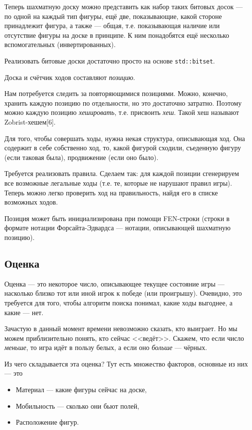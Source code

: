 {	Теперь шахматную доску можно представить как набор таких битовых досок --- по одной на каждый тип фигуры, ещё две, показывающие, какой стороне принадлежит фигура, а также --- общая, т.е. показывающая наличие или отсутствие фигуры на доске в принципе. К ним понадобятся ещё несколько вспомогательных (инвертированных).
	
	Реализовать битовые доски достаточно просто на основе \texttt{std::bitset}.
	
	Доска и счётчик ходов составляют \textit{позицию}.
	
	Нам потребуется следить за повторяющимися позициями. Можно, конечно, хранить каждую позицию по отдельности, но это достаточно затратно. Поэтому можно каждую позицию \textit{хешировать}, т.е. присвоить \textit{хеш}. Такой хеш называют Zobrist-хешем[6].
	
	Для того, чтобы совершать ходы, нужна некая структура, описывающая ход. Она содержит в себе собственно ход, то, какой фигурой сходили, съеденную фигуру (если таковая была), продвижение (если оно было).
	
	Требуется реализовать правила. Сделаем так: для каждой позиции сгенерируем все возможные легальные ходы (т.е. те, которые не нарушают правил игры). Теперь можно легко проверить ход на правильность, найдя его в списке возможных ходов.
	
	Позиция может быть инициализирована при помощи FEN-строки (строки в формате нотации Форсайта-Эдвардса --- нотации, описывающей шахматную позицию).
	
	\subsection{Оценка}
	 
	 Оценка --- это некоторое число, описывающее текущее состояние игры --- насколько близко тот или иной игрок к победе (или проигрышу). Очевидно, это требуется для того, чтобы алгоритм поиска понимал, какие ходы выгоднее, а какие --- нет. 
	 
	 Зачастую в данный момент времени невозможно сказать, кто выиграет. Но мы можем приблизительно понять, кто сейчас <<ведёт>>. Скажем, что если число \textit{меньше}, то игра идёт в пользу белых, а если оно \textit{больше} --- чёрных. 
	 
	 Из чего складывается эта оценка? Тут есть множество факторов, основные из них --- это
	 
	 \begin{itemize}
	 	\item Материал --- какие фигуры сейчас на доске,
	 	\item Мобильность --- сколько они бьют полей,
	 	\item Расположение фигур.
	 \end{itemize} 
 	
}
